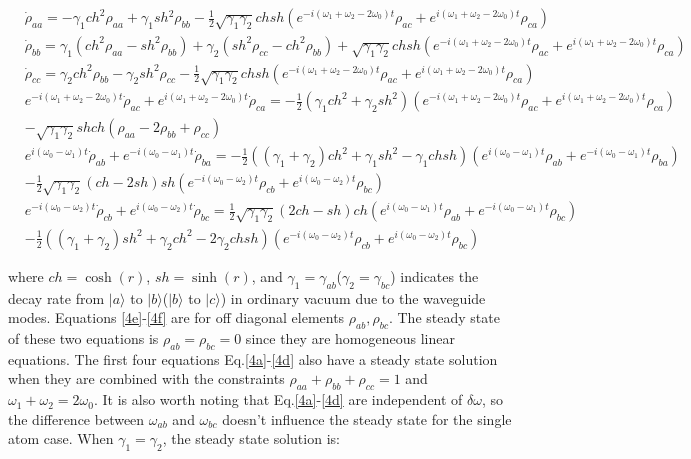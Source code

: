 \documentclass[aps,showpacs,twocolumn,twoside,groupedaddress]{revtex4}
\begin{document}
\begin{widetext}
\begin{subequations}
\begin{align}
&\dot{\rho}_{aa}=-\gamma_{1}ch^{2}\rho_{aa}+\gamma_{1}sh{}^{2}\rho_{bb}-\frac{1}{2}\sqrt{\gamma_{1}\gamma_{2}}chsh(e^{-i(\omega_{1}+\omega_{2}-2\omega_{0})t}\rho_{ac}+e^{i(\omega_{1}+\omega_{2}-2\omega_{0})t}\rho_{ca})\label{4a} \\
&\dot{\rho}_{bb}=\gamma_{1}(ch^{2}\rho_{aa}-sh^{2}\rho_{bb})+\gamma_{2}(sh^{2}\rho_{cc}-ch^{2}\rho_{bb})+\sqrt{\gamma_{1}\gamma_{2}}chsh(e^{-i(\omega_{1}+\omega_{2}-2\omega_{0})t}\rho_{ac}+e^{i(\omega_{1}+\omega_{2}-2\omega_{0})t}\rho_{ca})\label{4b}\\
&\dot{\rho}_{cc}=\gamma_{2}ch^{2}\rho_{bb}-\gamma_{2}sh^{2}\rho_{cc}-\frac{1}{2}\sqrt{\gamma_{1}\gamma_{2}}chsh(e^{-i(\omega_{1}+\omega_{2}-2\omega_{0})t}\rho_{ac}+e^{i(\omega_{1}+\omega_{2}-2\omega_{0})t}\rho_{ca})\label{4c}\\
&e^{-i(\omega_{1}+\omega_{2}-2\omega_{0})t}\dot{\rho}_{ac}+e^{i(\omega_{1}+\omega_{2}-2\omega_{0})t}\dot{\rho}_{ca}=-\frac{1}{2}(\gamma_{1}ch^{2}+\gamma_{2}sh^{2})(e^{-i(\omega_{1}+\omega_{2}-2\omega_{0})t}\rho_{ac}+e^{i(\omega_{1}+\omega_{2}-2\omega_{0})t}\rho_{ca})\\
&-\sqrt{\gamma_{1}\gamma_{2}}shch(\rho_{aa}-2\rho_{bb}+\rho_{cc})\label{4d}\\
&e^{i(\omega_{0}-\omega_{1})t}\dot{\rho}_{ab}+e^{-i(\omega_{0}-\omega_{1})t}\dot{\rho}_{ba}=-\frac{1}{2}((\gamma_{1}+\gamma_{2})ch^{2}+\gamma_{1}sh^{2}-\gamma_{1}chsh)(e^{i(\omega_{0}-\omega_{1})t}\rho_{ab}+e^{-i(\omega_{0}-\omega_{1})t}\rho_{ba})\\
&-\frac{1}{2}\sqrt{\gamma_{1}\gamma_{2}}(ch-2sh)sh(e^{-i(\omega_{0}-\omega_{2})t}\rho_{cb}+e^{i(\omega_{0}-\omega_{2})t}\rho_{bc})\label{4e}\\
&e^{-i(\omega_{0}-\omega_{2})t}\dot{\rho}_{cb}+e^{i(\omega_{0}-\omega_{2})t}\dot{\rho}_{bc}=\frac{1}{2}\sqrt{\gamma_{1}\gamma_{2}}(2ch-sh)ch(e^{i(\omega_{0}-\omega_{1})t}\rho_{ab}+e^{-i(\omega_{0}-\omega_{1})t}\rho_{bc})\\
&-\frac{1}{2}((\gamma_{1}+\gamma_{2})sh^{2}+\gamma_{2}ch^{2}-2\gamma_{2}chsh)(e^{-i(\omega_{0}-\omega_{2})t}\rho_{cb}+e^{i(\omega_{0}-\omega_{2})t}\rho_{bc})\label{4f}
\end{align}
\end{subequations}
\end{widetext}
where $ch=\cosh(r)$, $sh=\sinh(r)$, and $\gamma_{1}=\gamma_{ab}$($\gamma_{2}=\gamma_{bc}$) indicates the decay rate from $|a\rangle$ to $|b\rangle$($|b\rangle$ to $|c\rangle$) in ordinary vacuum due to the waveguide modes. Equations \eqref{4e}-\eqref{4f} are for off diagonal elements $\rho_{ab}, \rho_{bc}$. The steady state of these two equations is $\rho_{ab}=\rho_{bc}=0$ since they are homogeneous linear equations. The first four equations Eq.\eqref{4a}-\eqref{4d} also have a steady state solution when they are combined with the constraints $\rho_{aa}+\rho_{bb}+\rho_{cc}=1$ and $\omega_1+\omega_2=2\omega_0$. It is also worth noting that Eq.\eqref{4a}-\eqref{4d} are independent of $\delta\omega$, so the difference between $\omega_{ab}$ and $\omega_{bc}$ doesn't influence the steady state for the single atom case. When $\gamma_1=\gamma_2$, the steady state solution is:
\end{document}
